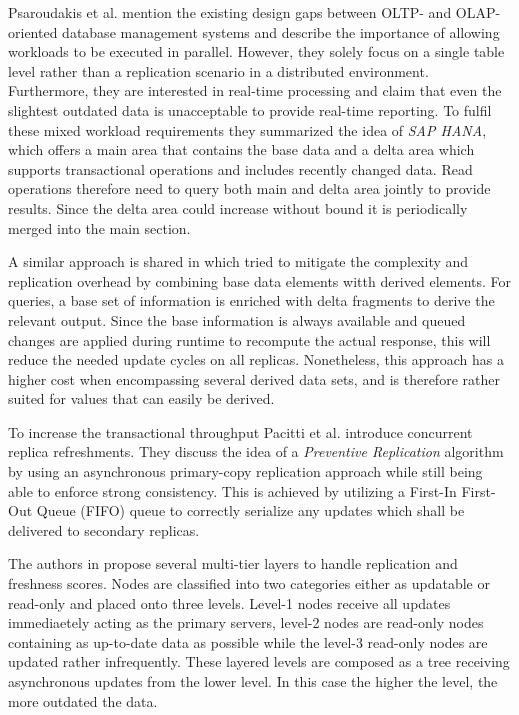 Psaroudakis et al. \cite{psaroudakis:2015} mention the existing design gaps between OLTP- and OLAP-oriented database management systems and describe the importance of 
allowing workloads to be executed in parallel. However, they solely focus on a single table level rather than a replication scenario in a distributed 
environment. Furthermore, they are interested in real-time processing and claim that even the slightest outdated data is unacceptable to provide real-time reporting.
To fulfil these mixed workload requirements they summarized the idea of \emph{SAP HANA}, which offers a main area that contains the base data and a delta area 
which supports transactional operations and includes recently changed data. Read operations therefore need to query both main and delta area jointly to provide results. 
Since the delta area could increase without bound it is periodically merged into the main section. 


A similar approach is shared in \cite{wei:2004} which tried to mitigate the complexity and replication overhead by combining base data elements witth derived elements.
For queries, a base set of information is enriched with delta fragments to derive the relevant output.
Since the base information is always available and queued changes are applied during runtime to recompute 
the actual response, this will reduce the needed update cycles on all replicas. Nonetheless, this approach has a higher cost when encompassing several derived data sets, and 
is therefore rather suited for values that can easily be derived.


To increase the transactional throughput Pacitti et al. \cite{pacitti:2005} introduce concurrent replica refreshments.
They discuss the idea of a \emph{Preventive Replication} algorithm by using an asynchronous primary-copy replication approach while still being able to enforce
strong consistency. This is achieved by utilizing a First-In First-Out Queue (FIFO) queue to correctly serialize any updates which shall be delivered to secondary replicas.

The authors in \cite{voicu:2010} propose several multi-tier layers to handle replication and freshness scores. 
Nodes are classified into two categories either as updatable or read-only and placed onto three levels.
Level-1 nodes receive all updates immediaetely acting as the primary servers, level-2 nodes are read-only nodes containing as up-to-date data as possible while the
level-3 read-only nodes are updated rather infrequently. These layered levels are composed as a tree receiving asynchronous updates from the lower level. 
In this case the higher the level, the more outdated the data.

